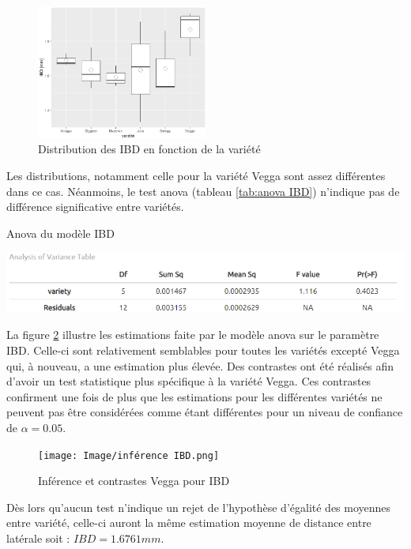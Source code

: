 \begin{figure}[ht]
\centering
\includegraphics[width=0.5\textwidth]{Image/boxplot IBD.png}
\caption{Distribution des IBD en fonction de la variété}
\label{fig:boxplot IBD}
\end{figure}

Les distributions, notamment celle pour la variété Vegga sont assez différentes dans ce cas.
Néanmoins, le test anova (tableau \ref{tab:anova IBD}) n'indique pas de différence significative entre variétés.

\begin{table}[ht]
    \centering
    \caption{Anova du modèle IBD}
    \includegraphics[width=1\textwidth]{Image/anova IBD.png}
    \label{tab:anova IBD}
\end{table}

La figure \ref{fig:inférence IBD} illustre les estimations faite par le modèle anova sur le paramètre IBD.
Celle-ci sont relativement semblables pour toutes les variétés excepté Vegga qui, à nouveau, a une estimation plus élevée.
Des contrastes ont été réalisés afin d'avoir un test statistique plus spécifique à la variété Vegga.
Ces contrastes confirment une fois de plus que les estimations pour les différentes variétés ne peuvent pas être considérées comme étant différentes pour un niveau de confiance de $\alpha = 0.05$.

\begin{figure}[ht]
\centering
\texttt{[image: Image/inférence IBD.png]}
\caption{Inférence et contrastes Vegga pour IBD}
\label{fig:inférence IBD}
\end{figure}

Dès lors qu'aucun test n'indique un rejet de l'hypothèse d'égalité des moyennes entre variété, celle-ci auront la même estimation moyenne de distance entre latérale soit : $IBD=1.6761 mm$.

